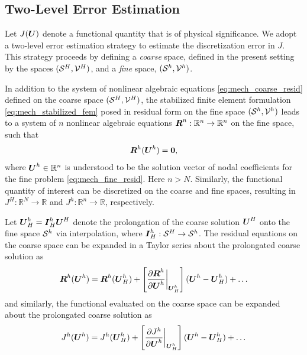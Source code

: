 \subsection{Two-Level Error Estimation}

Let $J(\bs{U})$ denote a functional quantity that is of physical significance.
We adopt a two-level error estimation strategy \cite{venditti2000adjoint,
venditti2002adjoint, venditti2003adjoint, fidkowski2011review} to estimate
the discretization error in $J$. This strategy proceeds by defining a
\emph{coarse} space, defined in the present setting by the spaces
$(\S^H, \V^H)$, and a \emph{fine} space, $(\S^h, \V^h)$.

In addition to the system of nonlinear algebraic equations
\eqref{eq:mech_coarse_resid} defined on the coarse space $(\S^H, \V^H)$,
the stabilized finite element formulation \eqref{eq:mech_stabilized_fem}
posed in residual form on the fine space $(\S^h, \V^h)$ leads to a system
of $n$ nonlinear algebraic equations $\bs{R}^n : \mathbb{R}^n \to
\mathbb{R}^n$ on the fine space, such that
%
\begin{gather}
\bs{R}^h(\bs{U}^h) = \bs{0},
\label{eq:mech_fine_resid}
\end{gather}
%
where $\bs{U}^h \in \mathbb{R}^n$ is understood to be the solution vector
of nodal coefficients for the fine problem \eqref{eq:mech_fine_resid}.
Here $n > N$. Similarly, the functional quantity of interest can be
discretized on the coarse and fine spaces, resulting in $J^H : \mathbb{R}^N
\to \mathbb{R}$ and $J^h : \mathbb{R}^n \to \mathbb{R}$, respectively.

Let $\bs{U}^h_H = \bs{I}^h_H \bs{U}^H$ denote the prolongation of the coarse
solution $\bs{U}^H$ onto the fine space $\S^h$ via interpolation, where
$\bs{I}^h_H : \S^H \to \S^h$. The residual equations on the coarse space can
be expanded in a Taylor series about the prolongated coarse solution as
%
\begin{gather}
\bs{R}^h(\bs{U}^h) = \bs{R}^h(\bs{U}^h_H) +
\left[ 
\frac{ \partial \bs{R}^h }{ \partial \bs{U}^h} \biggr|_{\bs{U}^h_H}
\right]
(\bs{U}^h - \bs{U}^h_H) + \dots
\label{eq:mech_residual_taylor}
\end{gather}
%
and similarly, the functional evaluated on the coarse space can be expanded
about the prolongated coarse solution as
%
\begin{gather}
J^h(\bs{U}^h) = J^h(\bs{U}^h_H) +
\left[
\frac{ \partial J^h } { \partial \bs{U}^h} \biggr|_{\bs{U}^h_H}
\right]
(\bs{U}^h - \bs{U}^h_H) + \dots
\label{eq:mech_functional_taylor}
\end{gather}

